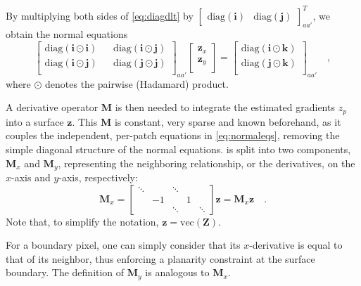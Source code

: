 By multiplying both sides of \eqref{eq:diagdlt} by $\begin{bmatrix}\mathrm{diag}(\mathbf{i}) & \mathrm{diag}(\mathbf{j}) \end{bmatrix}_{aa'}^T$, we obtain the normal equations
\begin{equation}
\label{eq:normaleqs}
\begin{bmatrix}
    \mathrm{diag}(\mathbf{i} \odot \mathbf{i}) && \mathrm{diag}(\mathbf{i} \odot \mathbf{j}) \\
    \mathrm{diag}(\mathbf{i} \odot \mathbf{j}) && \mathrm{diag}(\mathbf{j} \odot \mathbf{j}) \\
\end{bmatrix}_{aa'}
\begin{bmatrix}
\mathbf{z}_{x} \\
\mathbf{z}_{y} \\
\end{bmatrix}
=
\begin{bmatrix}
\mathrm{diag}(\mathbf{i} \odot \mathbf{k}) \\
\mathrm{diag}(\mathbf{j} \odot \mathbf{k}) \\
\end{bmatrix}_{aa'} \quad ,
\end{equation}
where $\odot$ denotes the pairwise (Hadamard) product.

A derivative operator $\mathbf{M}$ is then needed to integrate the estimated gradients $z_p$ into a surface $\mathbf{z}$. This $\mathbf{M}$ is constant, very sparse and known beforehand, as it couples the independent, per-patch equations in \eqref{eq:normaleqs}, removing the simple diagonal structure of the normal equations. is split into two components, $\mathbf{M}_x$ and $\mathbf{M}_y$, representing the neighboring relationship, or the derivatives, on the $x$-axis and $y$-axis, respectively:
\begin{equation}
\label{eq:M}
\mathbf{M}_x = 
\begin{bmatrix}
\ddots &    & \ddots &   &        \\
       & -1 &        & 1 &        \\
       &    & \ddots &   & \ddots
\end{bmatrix}
\mathbf{z} = \mathbf{M}_x\mathbf{z}  \quad.
\end{equation}
Note that, to simplify the notation, $\mathbf{z} = \mathrm{vec}(\mathbf{Z})$.

For a boundary pixel, one can simply consider that its $x$-derivative is equal to that of its neighbor, thus enforcing a planarity constraint at the surface boundary. The definition of $\mathbf{M}_y$ is analogous to $\mathbf{M}_x$.

